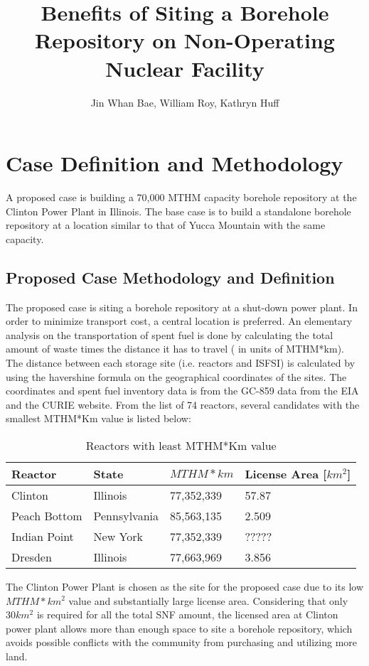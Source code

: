 \documentclass{anstrans}
\title{Benefits of Siting a Borehole Repository on Non-Operating Nuclear 
Facility}
\author{Jin Whan Bae, William Roy, Kathryn Huff}
\institute{
Dept. of Nuclear, Plasma, and Radiological Engineering, University of Illinois at Urbana-Champaign
\and
Urbana, IL
}
\begin{document}
\section{Case Definition and Methodology}

A proposed case is building a 70,000 \gls{MTHM} capacity borehole repository at the Clinton Power Plant in Illinois. The base case is to build a standalone borehole repository at a location similar to that of Yucca Mountain with the same capacity. 

\subsection{Proposed Case Methodology and Definition}
The proposed case is siting a borehole repository at a shut-down power plant.
 In order to minimize transport cost, a central location is preferred. An
  elementary analysis on the transportation of spent fuel is done by
   calculating the total amount of waste times the distance it has to travel
    ( in units of MTHM*km). The distance between each storage site 
    (i.e. reactors and \gls{ISFSI}) is calculated by 
    using the havershine formula on the geographical coordinates of the sites. The
     coordinates and spent fuel inventory data
    is from the GC-859 data from the \gls{EIA} %
    and the \gls{CURIE} website.
     From the list of 74 reactors, several candidates
    with the smallest MTHM*Km value is listed below:
    
    
\begin{table}[h]
\centering
    \caption { Reactors with least MTHM*Km value}
	\begin{tabular}{l|l|l|l}
	\hline
	Reactor & State & $MTHM*km$ & License Area [$km^2$]  \\ \hline
	Clinton & Illinois &  77,352,339 & 57.87   \\ \hline
	Peach Bottom & Pennsylvania & 85,563,135 & 2.509   \\ \hline
	Indian Point &   New York & 77,352,339 & ?????   \\ \hline
	Dresden & Illinois &  77,663,969 & 3.856   \\ \hline
	
	\end{tabular}
\end {table}


The Clinton Power Plant is chosen as the site for the proposed case due to its
low $MTHM*km^2$ value and substantially large license area. Considering that only
 $30km^2$ is required for all the total \gls{SNF} amount, the licensed area at Clinton power plant allows more than  enough space to site a borehole repository, which avoids
  possible conflicts with the community from purchasing and utilizing more land.
  
\end{document}
